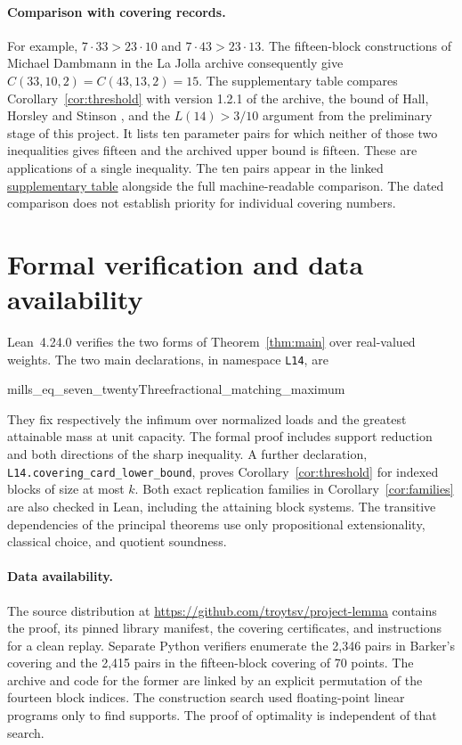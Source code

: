 \documentclass[11pt]{article}
\begin{document}
\paragraph{Comparison with covering records.}
For example, \(7\cdot33>23\cdot10\) and \(7\cdot43>23\cdot13\).
The fifteen-block constructions of Michael Dambmann in the La Jolla
archive \cite{gordon} consequently give \(C(33,10,2)=C(43,13,2)=15\).
The supplementary table compares Corollary~\ref{cor:threshold} with
version 1.2.1 of the archive, the bound of Hall, Horsley and Stinson
\cite[Theorem~1.5]{hhs}, and the \(L(14)>3/10\) argument from the preliminary stage of this project.
It lists ten parameter pairs for which neither of those two inequalities
gives fifteen and the archived upper bound is fifteen. These are
applications of a single inequality. The ten pairs appear in the linked
\href{https://github.com/troytsv/project-lemma/blob/mills-14-v1.0.0/problems/001-mills-number-14/results/ten-exact.csv}{supplementary table} alongside the full machine-readable comparison. The dated comparison does not
establish priority for individual covering numbers.

\section{Formal verification and data availability}
Lean~4.24.0 verifies the two forms of Theorem~\ref{thm:main} over
real-valued weights. The two main declarations, in namespace
\texttt{L14}, are
\begin{center}\small\ttfamily
mills\_eq\_seven\_twentyThree\qquad fractional\_matching\_maximum
\end{center}
\noindent
They fix respectively the infimum over normalized loads and the greatest
attainable mass at unit capacity. The formal proof includes support
reduction and both directions of the sharp inequality. A further
declaration, \texttt{L14.covering\_card\_lower\_bound}, proves
Corollary~\ref{cor:threshold} for indexed blocks of size at most \(k\).
Both exact replication families in Corollary~\ref{cor:families} are
also checked in Lean, including the attaining block systems.
The transitive dependencies of the principal theorems use only
propositional extensionality, classical choice, and quotient soundness.

\paragraph{Data availability.} The source distribution at
\url{https://github.com/troytsv/project-lemma}
contains
the proof, its pinned library manifest, the covering certificates, and
instructions for a clean replay. Separate Python verifiers enumerate
the 2,346 pairs in Barker's covering and the 2,415 pairs in the
fifteen-block covering of 70 points. The archive and code for the former
are linked by an explicit permutation of the fourteen block indices.
The construction search used floating-point linear programs only to
find supports. The proof of optimality is independent of that search.
\end{document}
